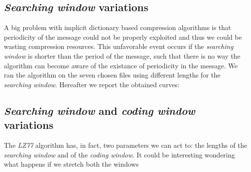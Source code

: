 \subsection{\textit{Searching window} variations}
A big problem with implicit dictionary based compression algorithms is that periodicity of the message could not be properly exploited and thus we could be wasting compression resources. This unfavorable event occurs if the \textit{searching window} is shorter than the period of the message, such that there is no way the algorithm can become aware of the existance of periodicity in the message. We ran the algorithm on the seven chosen files using different lengths for the \textit{searching window}. Hereafter we report the obtained curves:


\subsection{\textit{Searching window} and \textit{coding window} variations}
The \textit{LZ77} algorithm has, in fact, two parameters we can act to: the lengths of the \textit{searching window} and of the \textit{coding window}. It could be interesting wondering what happens if we stretch both the windows